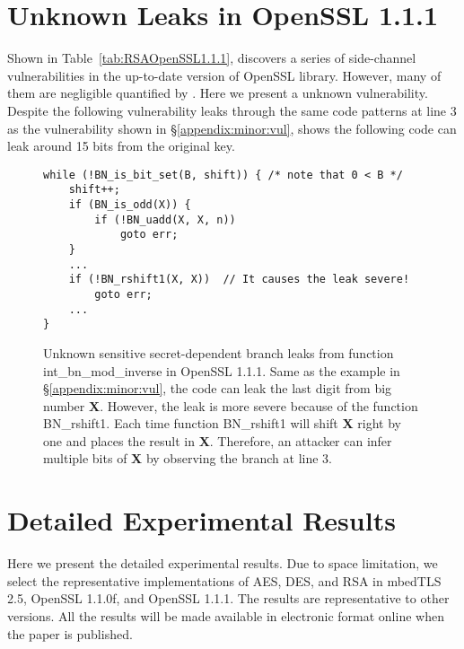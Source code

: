 \section{Unknown Leaks in OpenSSL 1.1.1}\label{unknown:leak}
Shown in Table~\ref{tab:RSAOpenSSL1.1.1}, \tool{} discovers a series
of side-channel vulnerabilities in the up-to-date version of OpenSSL library. 
However, many of them are negligible quantified by \tool{}.
Here we present a unknown vulnerability. Despite the following
vulnerability leaks through the same code patterns at line 3 as the vulnerability shown
in \S\ref{appendix:minor:vul}, \tool{} shows the following code can leak
around 15 bits from the original key.
\label{appendix:unknown}
\begin{figure}[h]
\centering
\begin{lstlisting}[xleftmargin=.02\textwidth,xrightmargin=.01\textwidth]
while (!BN_is_bit_set(B, shift)) { /* note that 0 < B */
    shift++;
    if (BN_is_odd(X)) {
        if (!BN_uadd(X, X, n))
            goto err;
    }
    ...
    if (!BN_rshift1(X, X))  // It causes the leak severe!
        goto err;
    ...
}
\end{lstlisting}
    \vspace*{-6pt}
    \caption{Unknown sensitive secret-dependent branch leaks from function 
             \textsf{int\_bn\_mod\_inverse} in OpenSSL 1.1.1. Same as the example
             in \S\ref{appendix:minor:vul}, the code can leak the last digit from
             big number \textbf{X}. However, the leak is more severe because of the 
             function \textsf{BN\_rshift1}. Each time function \textsf{BN\_rshift1}
             will shift \textbf{X} right by one and places the result in \textbf{X}. Therefore,
             an attacker can infer multiple bits of \textbf{X} by observing the branch at line 3.}
    \label{fig:unknown}
    \vspace*{-6pt}
\end{figure}

\section{Detailed Experimental Results}
\label{sec:result-table}

Here we present the detailed experimental results.
Due to space limitation, we select the representative implementations of
AES, DES, and RSA in
mbedTLS 2.5,
OpenSSL 1.1.0f,  and
OpenSSL 1.1.1.  
The results are representative to other versions.
All the results will be made available in electronic format online
when the paper is published. %

